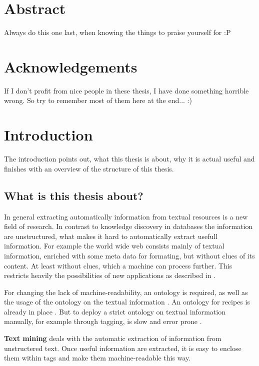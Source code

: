 \documentclass[12pt, twoside]{report}
\begin{document}
\chapter*{Abstract}
Always do this one last, when knowing the things to praise  yourself for :P

\chapter*{Acknowledgements}
If I don't profit from nice people in these thesis, I have done something horrible wrong. So try to remember most of them here at the end... :)

\tableofcontents



\chapter{Introduction}

The introduction points out, what this thesis is about, why it is actual useful and finishes with an overview of the structure of this thesis.

\section{What is this thesis about?}
In general extracting automatically information from textual resources is a new field of research. In contrast to knowledge discovery in databases the information are unstructured, what makes it hard to automatically extract usefull information. For example the world wide web consists mainly of textual information, enriched with some meta data for formating, but without clues of its content. At least without clues, which a machine can process further. This restricts heavily the possibilities of new applications as described in \parencite{semanticWeb}.

For changing the lack of machine-readability, an ontology is required, as well as the usage of the ontology on the textual information \parencite{semanticWeb}. An ontology for recipes is already in place \parencite{schemaRecipe}. But to deploy a strict ontology on textual information manually, for example through tagging, is slow and error prone \parencite{manualTagging}.

\textbf{Text mining} deals with the automatic extraction of information from unstructered text. Once useful information are extracted, it is easy to enclose them within tags and make them machine-readable this way.
\end{document}
